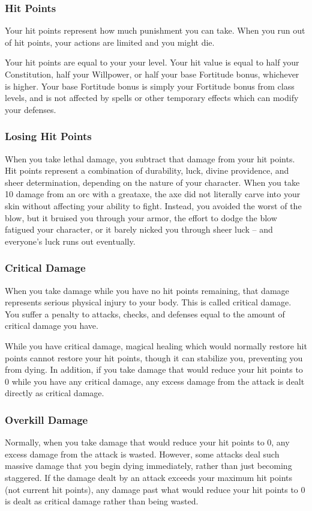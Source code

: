 \subsubsection{Hit Points}
Your hit points represent how much punishment you can take. When you run out of hit points, your actions are limited and you might die.

Your hit points are equal to your  \mtimes your level. Your hit value is equal to half your Constitution, half your Willpower, or half your base Fortitude bonus, whichever is higher. Your base Fortitude bonus is simply your Fortitude bonus from class levels, and is not affected by spells or other temporary effects which can modify your defenses.

\subsubsection{Losing Hit Points}
When you take lethal damage, you subtract that damage from your hit points.
 Hit points represent a combination of durability, luck, divine providence, and sheer determination, depending on the nature of your character. When you take 10 damage from an orc with a greataxe, the axe did not literally carve into your skin without affecting your ability to fight. Instead, you avoided the worst of the blow, but it bruised you through your armor, the effort to dodge the blow fatigued your character, or it barely nicked you through sheer luck -- and everyone's luck runs out eventually.

\subsubsection{Critical Damage}\label{Critical Damage}
When you take damage while you have no hit points remaining, that damage represents serious physical injury to your body. This is called critical damage. You suffer a penalty to attacks, checks, and defenses equal to the amount of critical damage you have.

While you have critical damage, magical healing which would normally restore hit points cannot restore your hit points, though it can stabilize you, preventing you from dying. In addition, if you take damage that would reduce your hit points to 0 while you have any critical damage, any excess damage from the attack is dealt directly as critical damage.

\subsubsection{Overkill Damage}
Normally, when you take damage that would reduce your hit points to 0, any excess damage from the attack is wasted. However, some attacks deal such massive damage that you begin dying immediately, rather than just becoming staggered. If the damage dealt by an attack exceeds your maximum hit points (not current hit points), any damage past what would reduce your hit points to 0 is dealt as critical damage rather than being wasted.

